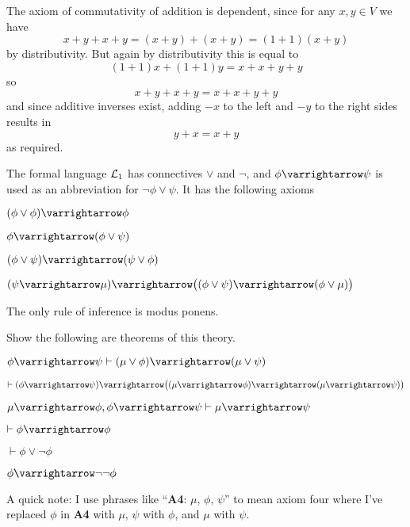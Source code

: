 \documentclass[10pt]{article}
\let\to=\varrightarrow
\def\mL{{\cal L}}
\def\bexerc{\begin{exercise*}}
\def\eexerc{\end{exercise*}}
\def\bblank{\begin{blankpp}}
\def\eblank{\end{blankpp}}
\begin{document}
\bblank

    The axiom of commutativity of addition is dependent, since for any $x,y\in V$ we have
    \[ x + y + x + y = (x+y) + (x+y) = (1 + 1)(x + y) \]
    by distributivity.
    But again by distributivity this is equal to
    \[ (1 + 1)x + (1 + 1)y = x + x + y + y \]
    so
    \[ x + y + x + y = x + x + y + y \]
    and since additive inverses exist, adding $-x$ to the left and $-y$ to the right sides results in
    \[ y + x = x + y \]
    as required.

\eblank

\def\Aone#1{\textbf{A1}: $#1$}
\def\Atwo#1#2{\textbf{A2}: $#1$, $#2$}
\def\Athree#1#2{\textbf{A3}: $#1$, $#2$}
\def\Afour#1#2#3{\textbf{A4}: $#1$, $#2$, $#3$}

\def\aone#1{(#1\lor#1)\to#1}
\def\atwo#1#2{#1\to(#1\lor#2)}
\def\athree#1#2{(#1\lor#2)\to(#2\lor#1)}
\def\afour#1#2#3{(#2\to#3)\to\bigl((#1\lor#2)\to(#1\lor#3)\bigr)}

\bexerc

    The formal language $\mL_1$ has connectives $\lor$ and $\neg$, and $\phi\to\psi$ is used as an abbreviation for $\neg\phi\lor\psi$.
    It has the following axioms

    \benum
        \gdef\enumstyle#1{$\mathbf{(A\the#1)}$}
        \gdef\enumindent{1cm}
        \item $\aone\phi$
        \item $\atwo\phi\psi$
        \item $\athree\phi\psi$
        \item $\afour\phi\psi\mu$
    \eenum

    The only rule of inference is modus ponens.

    Show the following are theorems of this theory.

    \benum
        \item $\phi\to\psi\vdash (\mu\lor\phi)\to(\mu\lor\psi)$
        \item $\vdash (\phi\to\psi)\to\bigl((\mu\to\phi)\to(\mu\to\psi)\bigr)$
        \item $\mu\to\phi,\phi\to\psi\vdash \mu\to\psi$
        \item $\vdash \phi\to\phi$
        \item $\vdash \phi\lor\neg\phi$
        \item $\phi\to\neg\neg\phi$
    \eenum

\eexerc

A quick note: I use phrases like ``\textbf{A4}: $\mu$, $\phi$, $\psi$'' to mean axiom four where I've replaced $\phi$ in \textbf{A4} with $\mu$, $\psi$ with $\phi$, and $\mu$ with $\psi$.
\end{document}
